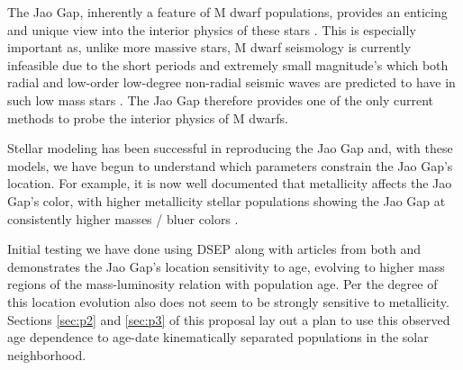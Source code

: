 The Jao Gap, inherently a feature of M dwarf populations, provides an enticing
and unique view into the interior physics of these stars \citep{Feiden2021}.
This is especially important as, unlike more massive stars, M dwarf seismology
is currently infeasible due to the short periods and extremely small
magnitude's which both radial and low-order low-degree non-radial seismic waves
are predicted to have in such low mass stars \citep{Rodriguez-Lopez2019}. The
Jao Gap therefore provides one of the only current methods to probe the
interior physics of M dwarfs.

Stellar modeling has been successful in reproducing the Jao Gap
\citep[e.g.][]{Feiden2021,Mansfield2021} and, with these models, we have begun
to understand which parameters constrain the Jao Gap's location. For example,
it is now well documented that metallicity affects the Jao Gap's color, with
higher metallicity stellar populations showing the Jao Gap at consistently
higher masses / bluer colors \citep{Mansfield2021}.

Initial testing we have done using DSEP along with articles from both
\citeauthor{Feiden2021} and \citeauthor{Mansfield2021} demonstrates the Jao Gap's
location sensitivity to age, evolving to higher mass regions of the
mass-luminosity relation with population age. Per \citet{Mansfield2021} the
degree of this location evolution also does not seem to be strongly sensitive
to metallicity. Sections \ref{sec:p2} and \ref{sec:p3} of this proposal lay out
a plan to use this observed age dependence to age-date kinematically separated
populations in the solar neighborhood.
